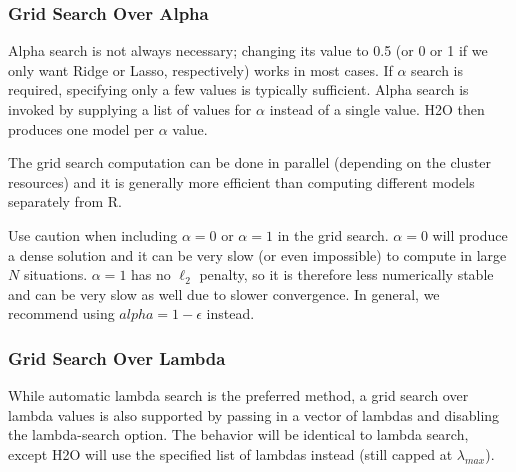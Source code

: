 \newpage
\subsubsection{Grid Search Over Alpha}

Alpha search is not always necessary; changing its value to 0.5 (or 0 or 1 if we only want Ridge or Lasso,
respectively) works in most cases. If $\alpha$ search is required, specifying only a few values is typically sufficient. Alpha
search is invoked by supplying a list of values for $\alpha$ instead of a single value. H2O then produces one model
per $\alpha$ value. 

The grid search computation can be done in parallel (depending on the cluster resources) and it
is generally more efficient than computing different models separately from R.

Use caution when including $\alpha=0$ or $\alpha=1$ in the grid search. $\alpha=0$ will produce a dense solution
and it can be very slow (or even impossible) to compute in large $N$ situations. $\alpha=1$ has no  $\ell_2$ penalty, so
it is therefore less numerically stable and can be very slow as well due to slower convergence. In general, we recommend using $alpha=1-\epsilon$ instead.

\waterExampleInR


\newpage
\waterExampleInPython


\subsubsection{Grid Search Over Lambda}

 While automatic lambda search is the preferred method,  a grid search over lambda values is also supported
 by passing in a vector of lambdas and disabling the lambda-search option. The behavior will be identical to lambda
 search, except H2O will use the specified list of lambdas instead (still capped at $\lambda_{max}$).

\waterExampleInR


\waterExampleInPython



